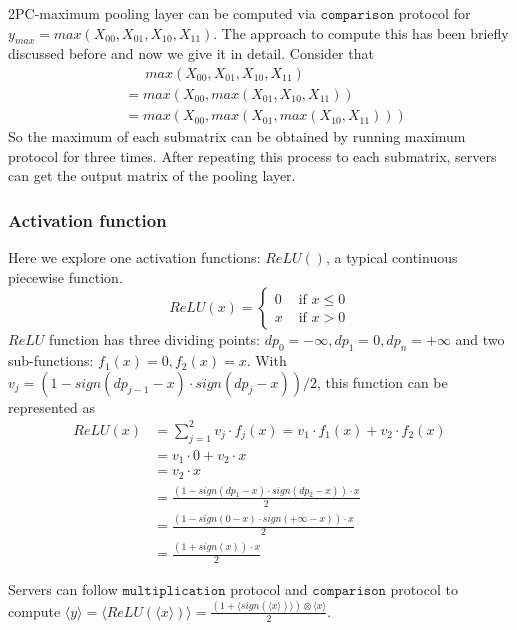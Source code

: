 \documentclass[letterpaper]{article} %
\begin{document}
    2PC-maximum pooling layer can be computed via $\mathtt{comparison}$ protocol for 
    $y_{max}=max(X_{00}, X_{01}, X_{10}, X_{11})$. 
    The approach to compute this has been briefly discussed before and now we give it in detail.
    Consider that
    \begin{align*}
        &\enspace \enspace \enspace  max(X_{00}, X_{01}, X_{10}, X_{11}) \\
        &= max(X_{00},max(X_{01}, X_{10}, X_{11})) \\
      &= max(X_{00},max(X_{01},max(X_{10}, X_{11})))
    \end{align*}
    So the maximum of each submatrix can be obtained by running 
    maximum protocol for three times. 
    After repeating this process to each submatrix, servers can get the output matrix of the pooling layer.
    
    
    \subsubsection{Activation function}
    Here we explore one  activation functions: $ReLU()$, a typical continuous piecewise function.
    $$ReLU(x)=\begin{cases}
        0 & \text{ if } x \leqslant 0  \\ 
        x & \text{ if } x > 0
        \end{cases}$$
    $ReLU$ function has three dividing points: $dp_{0}= -\infty ,dp_{1}= 0, dp_{n}=+\infty$ and two sub-functions:
    $f_{1}(x)= 0 ,f_{2}(x)= x$.
    With $v_{j} = (1-sign(dp_{j-1}-x)\cdot sign(dp_{j}-x))/2$, this function can be represented as 
    \begin{align*}
        ReLU(x)&=\sum_{j=1}^{2}v_{j}\cdot f_{j}(x)=v_{1}\cdot f_{1}(x)+v_{2}\cdot f_{2}(x)\\
        &=v_{1}\cdot 0 +v_{2}\cdot x\\
        &=v_{2}\cdot x\\
        &=\frac{(1-sign(dp_{1}-x)\cdot sign(dp_{2}-x))\cdot x}{2} \\
        &=\frac{(1-sign(0-x)\cdot sign(+\infty -x))\cdot x}{2} \\
        &=\frac{(1+sign(x))\cdot x}{2}
    \end{align*}
    
    Servers can follow $\mathtt{multiplication}$ protocol and $\mathtt{comparison}$ protocol to compute 
    $\langle y\rangle=\langle ReLU(\langle x\rangle)\rangle=\frac{(1+\langle sign(\langle x\rangle)\rangle)\otimes \langle x\rangle}{2}$.
    
\end{document}
